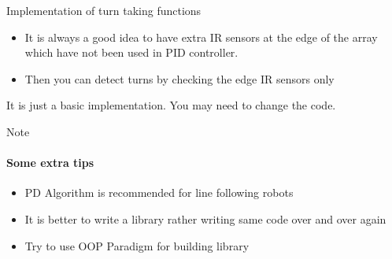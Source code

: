 \documentclass{beamer}
\begin{document}
 	
 	\begin{frame}[allowframebreaks]{Implementation of turn taking functions}
 	
 	\begin{itemize}
		
		\item{It is always a good idea to have extra IR sensors at the edge of the array which have not been used in PID controller.}
		
		\item{Then you can detect turns by checking the edge IR sensors only}
		
		 		
 		
 	\end{itemize}
 	
 		\turnLeft
 		
 	It is just a basic implementation. You may need to change the code.
 	
 	\end{frame}
 	
 	
 	\begin{frame}{Note}
 	\framesubtitle{Some extra tips}
 	
 	\begin{itemize}
 		
 		\item{PD Algorithm is recommended for line following robots}
 		\item{It is better to write a library rather writing same code over and over again}
 		
 		\item{Try to use OOP Paradigm for building library}
 		
 		
 		
 	\end{itemize}
 	
 	\end{frame}
  
\end{document}
